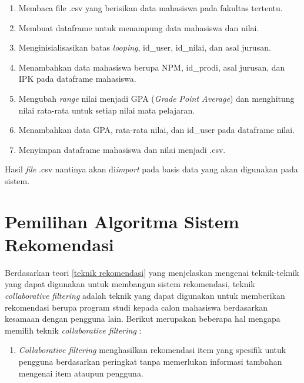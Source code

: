 \begin{enumerate}
    \item Membaca file .csv yang berisikan data mahasiswa pada fakultas tertentu.
    
    \item Membuat dataframe untuk menampung data mahasiswa dan nilai.
    
    \item Menginisialisasikan batas \textit{looping}, id\_user, id\_nilai, dan asal jurusan.
    
    \item Menambahkan data mahasiswa berupa NPM, id\_prodi, asal jurusan, dan IPK pada dataframe mahasiswa.
    
    \item Mengubah \textit{range} nilai menjadi GPA (\textit{Grade Point Average}) dan menghitung nilai rata-rata untuk setiap nilai mata pelajaran.
    
    \item Menambahkan data GPA, rata-rata nilai, dan id\_user pada dataframe nilai.
    
    \item Menyimpan dataframe mahasiswa dan nilai menjadi .csv.
\end{enumerate}

Hasil \textit{file} .csv nantinya akan di\textit{import} pada basis data yang akan digunakan pada sistem.  

\section{Pemilihan Algoritma Sistem Rekomendasi}
Berdasarkan teori \ref{teknik rekomendasi} yang menjelaskan mengenai teknik-teknik yang dapat digunakan untuk membangun sistem rekomendasi, teknik \textit{collaborative filtering} adalah teknik yang dapat digunakan untuk memberikan rekomendasi berupa program studi kepada calon mahasiswa berdasarkan kesamaan dengan pengguna lain. Berikut merupakan beberapa hal mengapa memilih teknik \textit{collaborative filtering} :

\begin{enumerate}
    \item \textit{Collaborative filtering} menghasilkan rekomendasi item yang spesifik untuk pengguna berdasarkan peringkat tanpa memerlukan informasi tambahan mengenai item ataupun pengguna.
    
\end{enumerate}

